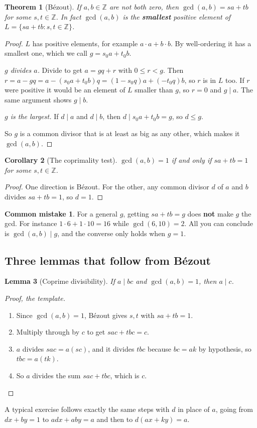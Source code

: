 \documentclass[11pt,a4paper]{article}
\newtheorem{theorem}{Theorem}[section]
\newtheorem{lemma}[theorem]{Lemma}
\newtheorem{corollary}[theorem]{Corollary}
\theoremstyle{definition}
\newcommand{\Z}{\mathbb{Z}}
\theoremstyle{noteit}
\theoremstyle{note}
\newtheorem*{mistakeX}{Common mistake}
\newenvironment{mistake}{\begin{mistakeX}\leavevmode\marginpar{\raggedleft\vspace*{-0.9\baselineskip}\dbend}\ignorespaces}{\end{mistakeX}}
\begin{document}
\begin{theorem}[Bézout]
If $a,b\in\Z$ are not both zero, then $\gcd(a,b)=sa+tb$ for some $s,t\in\Z$. In fact $\gcd(a,b)$ is the \textbf{smallest} positive element of $L=\{sa+tb: s,t\in\Z\}$.
\end{theorem}

\begin{proof}
$L$ has positive elements, for example $a\cdot a+b\cdot b$. By well-ordering it has a smallest one, which we call $g=s_0a+t_0b$.

\emph{$g$ divides $a$.} Divide to get $a=gq+r$ with $0\le r<g$. Then $r=a-gq=a-(s_0a+t_0b)q=(1-s_0q)a+(-t_0q)b$, so $r$ is in $L$ too. If $r$ were positive it would be an element of $L$ smaller than $g$, so $r=0$ and $g\mid a$. The same argument shows $g\mid b$.

\emph{$g$ is the largest.} If $d\mid a$ and $d\mid b$, then $d\mid s_0a+t_0b=g$, so $d\le g$.

So $g$ is a common divisor that is at least as big as any other, which makes it $\gcd(a,b)$.
\end{proof}

\begin{corollary}[The coprimality test]
$\gcd(a,b)=1$ if and only if $sa+tb=1$ for some $s,t\in\Z$.
\end{corollary}
\begin{proof}
One direction is Bézout. For the other, any common divisor $d$ of $a$ and $b$ divides $sa+tb=1$, so $d=1$.
\end{proof}

\begin{mistake}
For a general $g$, getting $sa+tb=g$ does \textbf{not} make $g$ the gcd. For instance $1\cdot 6+1\cdot 10=16$ while $\gcd(6,10)=2$. All you can conclude is $\gcd(a,b)\mid g$, and the converse only holds when $g=1$.
\end{mistake}

\subsection{Three lemmas that follow from Bézout}

\begin{lemma}[Coprime divisibility]\label{lem:coprime}
If $a\mid bc$ and $\gcd(a,b)=1$, then $a\mid c$.
\end{lemma}
\begin{proof}[Proof, the template]
\begin{enumerate}
\item Since $\gcd(a,b)=1$, Bézout gives $s,t$ with $sa+tb=1$.
\item Multiply through by $c$ to get $sac+tbc=c$.
\item $a$ divides $sac=a(sc)$, and it divides $tbc$ because $bc=ak$ by hypothesis, so $tbc=a(tk)$.
\item So $a$ divides the sum $sac+tbc$, which is $c$.\qedhere
\end{enumerate}
\end{proof}
A typical exercise follows exactly the same steps with $d$ in place of $a$, going from $dx+by=1$ to $adx+aby=a$ and then to $d(ax+ky)=a$.
\end{document}
